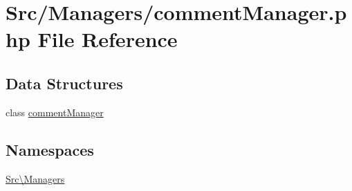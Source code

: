 \hypertarget{comment_manager_8php}{}\section{Src/\+Managers/comment\+Manager.php File Reference}
\label{comment_manager_8php}
\subsection*{Data Structures}
\begin{DoxyCompactItemize}
\item 
class \hyperlink{class_src_1_1_managers_1_1comment_manager}{comment\+Manager}
\end{DoxyCompactItemize}
\subsection*{Namespaces}
\begin{DoxyCompactItemize}
\item 
 \hyperlink{namespace_src_1_1_managers}{Src\textbackslash{}\+Managers}
\end{DoxyCompactItemize}
